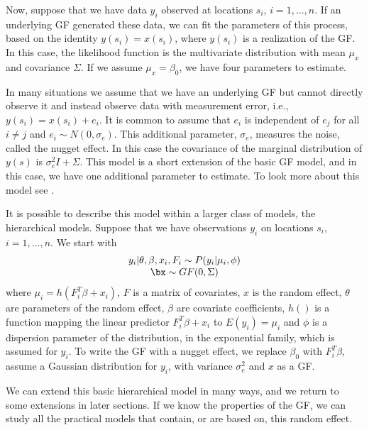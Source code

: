 Now, suppose that we have data $y_i$ observed at 
locations $s_i$, $i=1,...,n$. 
If an underlying GF generated these data, we can fit the 
parameters of this process, based on the identity 
$y(s_i) = x(s_i)$, where $y(s_i)$ is a 
realization of the GF. 
In this case, the likelihood function 
is the multivariate distribution with 
mean $\mu_x$ and covariance $\Sigma$. 
If we assume $\mu_x = \beta_0$, 
we have four parameters to estimate. 

In many situations we assume that we have an underlying 
GF but cannot directly observe it and instead observe 
data with measurement error, i.e., 
$y(s_i) = x(s_i) + e_i$. 
It is common to assume that $e_i$ is 
independent of $e_j$ for all $i\neq j$ and 
$e_i \sim N(0, \sigma_e)$. 
This additional parameter, $\sigma_e$, measures 
the noise, called the nugget effect. 
In this case the covariance of the marginal distribution 
of $y(s)$ is $\sigma^2_eI + \Sigma$. 
This model is a short extension of the basic GF model, 
and in this case, we have one additional parameter 
to estimate. 
To look more about this model 
see \cite{diggleribeiro:2007}. 

It is possible to describe this model within a 
larger class of models, the hierarchical models. 
Suppose that we have observations $y_i$ on locations 
$s_i$, $i=1,...,n$. We start with 
\begin{equation}\begin{array}{c}
y_i|\theta,\beta,x_i,F_i \sim P(y_i|\mu_i,\phi) \\
\bx \sim GF(0, \Sigma)
\end{array}\end{equation}
where $\mu_i = h(F_i^{T}\beta + x_i)$, 
$F$ is a matrix of covariates, 
$x$ is the random effect, 
$\theta$ are parameters of the random effect, 
$\beta$ are covariate coefficients, 
$h()$ is a function mapping the linear predictor 
$F_i^{T}\beta + x_i$ to $E(y_i) = \mu_i$ and 
$\phi$ is a dispersion parameter of the distribution, 
in the exponential family, which is assumed for $y_i$. 
To write the GF with a nugget effect, 
we replace $\beta_0$ with $F_i^{T}\beta$, 
assume a Gaussian distribution for $y_i$, with 
variance $\sigma_e^2$ and $x$ as a GF.

We can extend this basic hierarchical model in many ways,
and we return to some extensions in later sections. 
If we know the properties of the GF, 
we can study all the practical models 
that contain, or are based on, this random effect. 

